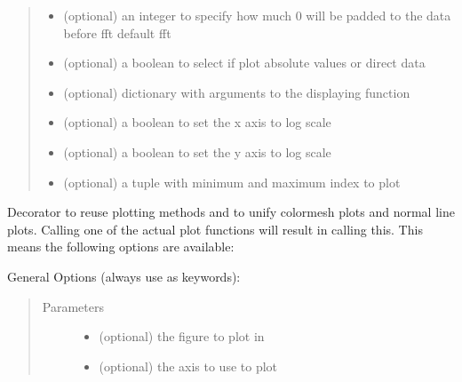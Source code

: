 \documentclass[letterpaper,10pt,openany,oneside,english]{sphinxmanual}
\begin{document}
\begin{fulllineitems}
\begin{fulllineitems}
\begin{quote}
\begin{description}
\begin{itemize}
\item {} 
 \textendash{} (optional) an integer to specify how much 0 will be padded to the data  
before fft default fft

\item {} 
 \textendash{} (optional) a boolean to select if plot absolute values or direct data

\item {} 
 \textendash{} (optional) dictionary with arguments to the displaying function

\item {} 
 \textendash{} (optional) a boolean to set the x axis to log scale

\item {} 
 \textendash{} (optional) a boolean to set the y axis to log scale

\item {} 
 \textendash{} (optional) a tuple with minimum and maximum index to plot

\end{itemize}

\end{description}\end{quote}

\end{fulllineitems}


\begin{fulllineitems}
\label{\detokenize{plots:plots.SimplePlotter.meshPlot}}
Decorator to reuse plotting methods and to unify colormesh plots and normal line plots.  
Calling one of the actual plot functions will result in calling this.  
This means the following options are available:

General Options (always use as keywords):
\begin{quote}\begin{description}
\item[{Parameters}] \leavevmode\begin{itemize}
\item {} 
 \textendash{} (optional) the figure to plot in

\item {} 
 \textendash{} (optional) the axis to use to plot


\end{itemize}
\end{description}
\end{quote}
\end{fulllineitems}
\end{fulllineitems}
\end{document}
